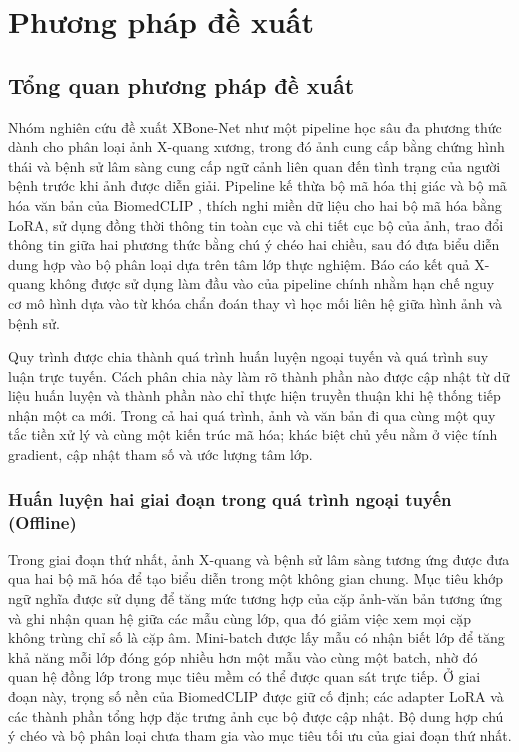 \chapter{Phương pháp đề xuất}
\label{Chapter3}

\section{Tổng quan phương pháp đề xuất}
\label{sec:final-pipeline}

Nhóm nghiên cứu đề xuất XBone-Net như một pipeline học sâu đa phương thức dành cho phân loại ảnh X-quang xương, trong đó ảnh cung cấp bằng chứng hình thái và bệnh sử lâm sàng cung cấp ngữ cảnh liên quan đến tình trạng của người bệnh trước khi ảnh được diễn giải. Pipeline kế thừa bộ mã hóa thị giác và bộ mã hóa văn bản của BiomedCLIP \cite{BiomedCLIP}, thích nghi miền dữ liệu cho hai bộ mã hóa bằng LoRA, sử dụng đồng thời thông tin toàn cục và chi tiết cục bộ của ảnh, trao đổi thông tin giữa hai phương thức bằng chú ý chéo hai chiều, sau đó đưa biểu diễn dung hợp vào bộ phân loại dựa trên tâm lớp thực nghiệm. Báo cáo kết quả X-quang không được sử dụng làm đầu vào của pipeline chính nhằm hạn chế nguy cơ mô hình dựa vào từ khóa chẩn đoán thay vì học mối liên hệ giữa hình ảnh và bệnh sử.

Quy trình được chia thành quá trình huấn luyện ngoại tuyến và quá trình suy luận trực tuyến. Cách phân chia này làm rõ thành phần nào được cập nhật từ dữ liệu huấn luyện và thành phần nào chỉ thực hiện truyền thuận khi hệ thống tiếp nhận một ca mới. Trong cả hai quá trình, ảnh và văn bản đi qua cùng một quy tắc tiền xử lý và cùng một kiến trúc mã hóa; khác biệt chủ yếu nằm ở việc tính gradient, cập nhật tham số và ước lượng tâm lớp.

\subsection{Huấn luyện hai giai đoạn trong quá trình ngoại tuyến (Offline)}

Trong giai đoạn thứ nhất, ảnh X-quang và bệnh sử lâm sàng tương ứng được đưa qua hai bộ mã hóa để tạo biểu diễn trong một không gian chung. Mục tiêu khớp ngữ nghĩa được sử dụng để tăng mức tương hợp của cặp ảnh-văn bản tương ứng và ghi nhận quan hệ giữa các mẫu cùng lớp, qua đó giảm việc xem mọi cặp không trùng chỉ số là cặp âm. Mini-batch được lấy mẫu có nhận biết lớp để tăng khả năng mỗi lớp đóng góp nhiều hơn một mẫu vào cùng một batch, nhờ đó quan hệ đồng lớp trong mục tiêu mềm có thể được quan sát trực tiếp. Ở giai đoạn này, trọng số nền của BiomedCLIP được giữ cố định; các adapter LoRA và các thành phần tổng hợp đặc trưng ảnh cục bộ được cập nhật. Bộ dung hợp chú ý chéo và bộ phân loại chưa tham gia vào mục tiêu tối ưu của giai đoạn thứ nhất.

